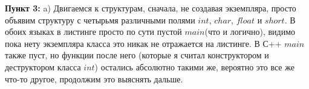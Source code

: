 \documentclass[a4paper,12pt]{article}
\begin{document}
\begin{figure}[H]
{\begin{minipage}[t]{0.4\textwidth}
    \end{minipage}}
\end{figure}

\textbf{Пункт 3:} 
a) Двигаемся к структурам, сначала, не создавая экземпляра, просто объявим структуру с четырьмя различными полями $int$, $char$, $float$ и $short$. В обоих языках в листинге просто по сути пустой $main$(что и логично), видимо пока нету экземпляра класса это никак не отражается на листинге. В С++ $main$ также пуст, но функции после него (которые я считал конструктором и деструктором класса $int$) остались абсолютно такими же, вероятно это все же что-то другое, продолжим это выяснять дальше.
\end{document}
